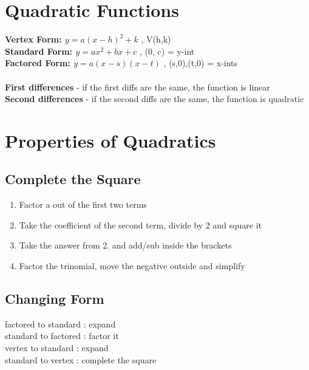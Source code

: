 \documentclass{article}
\begin{document}

\section{Quadratic Functions}

\textbf{Vertex Form: $y = a(x-h)^2+k$} , V(h,k) \\
\textbf{Standard Form: $y = ax^2+bx+c$} , (0, c) = y-int \\
\textbf{Factored Form: $y = a(x-s)(x-t)$} , (s,0),(t,0) = x-ints\\\\

\noindent
\textbf{First differences} - if the first diffs are the same, the function is linear \\
\textbf{Second differences} - if the second diffs are the same, the function is quadratic\\


\section{Properties of Quadratics}

\subsection*{Complete the Square}
\begin{enumerate}
    \item Factor a out of the first two terms
    \item Take the coefficient of the second term, divide by 2 and square it
    \item Take the answer from 2. and add/sub inside the brackets
    \item Factor the trinomial, move the negative outside and simplify
\end{enumerate}

\subsection*{Changing Form}
factored to standard : expand\\
standard to factored : factor it\\
vertex to standard : expand \\
standard to vertex : complete the square
\end{document}
